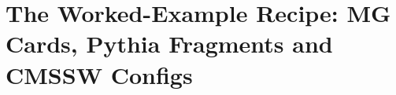 \chapter{The Worked-Example Recipe: MG Cards, Pythia Fragments and CMSSW Configs}
\label{app:worked_example}

